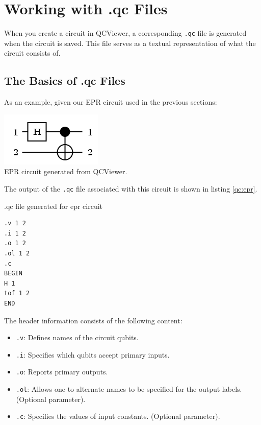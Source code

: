 \documentclass[10pt]{article}
\theoremstyle{definition}
\begin{document}
\section{Working with .qc Files}\label{sec:QCFiles}

When you create a circuit in QCViewer, a corresponding \verb+.qc+ file is generated when the circuit is saved. This file serves as a textual representation of what the circuit consists of. 

\subsection{The Basics of .qc Files}\label{sec:BasicsOfQCFiles}

As an example, given our EPR circuit used in the previous sections:

\begin{center}
\includegraphics[scale=.7]{Figures/QCFiles/EPRCircuit} \\
EPR circuit generated from QCViewer.
\end{center}

The output of the \verb+.qc+ file associated with this circuit is shown in listing \ref{qc:epr}.

\begin{program}
\caption{.qc file generated for epr circuit}
\label{qc:epr}
\begin{verbatim}
.v 1 2
.i 1 2
.o 1 2
.ol 1 2
.c
BEGIN
H 1
tof 1 2
END
\end{verbatim}
\end{program}

The header information consists of the following content:

\begin{itemize}
\item \verb+.v+: Defines names of the circuit qubits.
\item \verb+.i+: Specifies which qubits accept primary inputs.
\item \verb+.o+: Reports primary outputs.
\item \verb+.ol+: Allows one to alternate names to be specified for the output labels. (Optional parameter).
\item \verb+.c+: Specifies the values of input constants. (Optional parameter).
\end{itemize}
\end{document}
